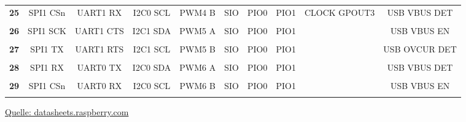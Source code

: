 \documentclass[a4paper,12pt,twoside]{article}
\begin{document}
\begin{center}
{\begin{tabular}{|c|*{9}{c|}}
			\textbf{25}   & SPI1 CSn    & UART1 RX    & I2C0 SCL    & PWM4 B      & SIO         & PIO0        & PIO1        & CLOCK GPOUT3 & USB VBUS DET  \\
			              &             &             &             &             &             &             &             &              &               \\ \hline
			\textbf{26}   & SPI1 SCK    & UART1 CTS   & I2C1 SDA    & PWM5 A      & SIO         & PIO0        & PIO1        &              & USB VBUS EN   \\
			              &             &             &             &             &             &             &             &              &               \\ \hline
			\textbf{27}   & SPI1 TX     & UART1 RTS   & I2C1 SCL    & PWM5 B      & SIO         & PIO0        & PIO1        &              & USB OVCUR DET \\
			              &             &             &             &             &             &             &             &              &               \\ \hline
			\textbf{28}   & SPI1 RX     & UART0 TX    & I2C0 SDA    & PWM6 A      & SIO         & PIO0        & PIO1        &              & USB VBUS DET  \\
			              &             &             &             &             &             &             &             &              &               \\ \hline
			\textbf{29}   & SPI1 CSn    & UART0 RX    & I2C0 SCL    & PWM6 B      & SIO         & PIO0        & PIO1        &              & USB VBUS EN   \\
			              &             &             &             &             &             &             &             &              &               \\ \hline
		\end{tabular}%
	}
	\small \href{https://datasheets.raspberrypi.com/rp2040/rp2040-datasheet.pdf}{Quelle: datasheets.raspberry.com}
\end{center}
\end{document}

